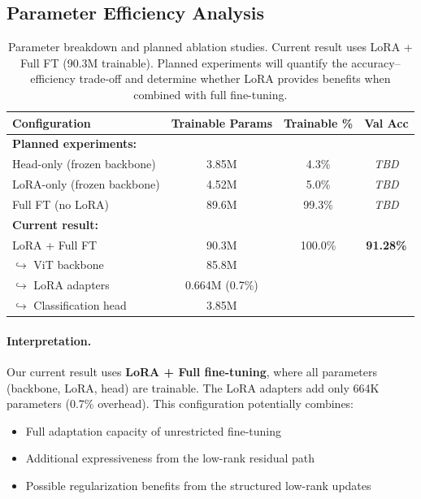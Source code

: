 \documentclass[11pt]{article}
\begin{document}
\subsection{Parameter Efficiency Analysis}

\begin{table}[H]
\centering
\small
\begin{tabular}{lccc}
\toprule
\textbf{Configuration} & \textbf{Trainable Params} & \textbf{Trainable \%} & \textbf{Val Acc} \\
\midrule
\textbf{Planned experiments:} & & & \\
\quad Head-only (frozen backbone) & 3.85M & 4.3\% & \textit{TBD} \\
\quad LoRA-only (frozen backbone) & 4.52M & 5.0\% & \textit{TBD} \\
\quad Full FT (no LoRA) & 89.6M & 99.3\% & \textit{TBD} \\
\midrule
\textbf{Current result:} & & & \\
\quad LoRA + Full FT & 90.3M & 100.0\% & \textbf{91.28\%} \\
\quad \quad $\hookrightarrow$ ViT backbone & 85.8M & & \\
\quad \quad $\hookrightarrow$ LoRA adapters & 0.664M (0.7\%) & & \\
\quad \quad $\hookrightarrow$ Classification head & 3.85M & & \\
\bottomrule
\end{tabular}
\caption{Parameter breakdown and planned ablation studies. Current result uses LoRA + Full FT (90.3M trainable). Planned experiments will quantify the accuracy--efficiency trade-off and determine whether LoRA provides benefits when combined with full fine-tuning.}
\label{tab:params}
\end{table}

\paragraph{Interpretation.}
Our current result uses \textbf{LoRA + Full fine-tuning}, where all parameters (backbone, LoRA, head) are trainable. The LoRA adapters add only 664K parameters (0.7\% overhead). This configuration potentially combines:
\begin{itemize}
    \item Full adaptation capacity of unrestricted fine-tuning
    \item Additional expressiveness from the low-rank residual path
    \item Possible regularization benefits from the structured low-rank updates
\end{itemize}
\end{document}
